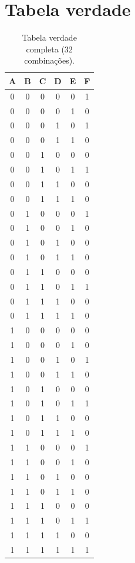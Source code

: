 \documentclass[report, 12pt]{uftreport}
\begin{document}
\section{Tabela verdade}
  \begin{table}[htb]
  \centering
  \caption{Tabela verdade completa (32 combinações).}
  \label{tab:tabela-verdade}
  \begin{tabular}{ccccc|c}
    \toprule
    A & B & C & D & E & F \\
    \midrule
    0 & 0 & 0 & 0 & 0 & 1 \\
    0 & 0 & 0 & 0 & 1 & 0 \\
    0 & 0 & 0 & 1 & 0 & 1 \\
    0 & 0 & 0 & 1 & 1 & 0 \\
    0 & 0 & 1 & 0 & 0 & 0 \\
    0 & 0 & 1 & 0 & 1 & 1 \\
    0 & 0 & 1 & 1 & 0 & 0 \\
    0 & 0 & 1 & 1 & 1 & 0 \\
    0 & 1 & 0 & 0 & 0 & 1 \\
    0 & 1 & 0 & 0 & 1 & 0 \\
    0 & 1 & 0 & 1 & 0 & 0 \\
    0 & 1 & 0 & 1 & 1 & 0 \\
    0 & 1 & 1 & 0 & 0 & 0 \\
    0 & 1 & 1 & 0 & 1 & 1 \\
    0 & 1 & 1 & 1 & 0 & 0 \\
    0 & 1 & 1 & 1 & 1 & 0 \\
    1 & 0 & 0 & 0 & 0 & 0 \\
    1 & 0 & 0 & 0 & 1 & 0 \\
    1 & 0 & 0 & 1 & 0 & 1 \\
    1 & 0 & 0 & 1 & 1 & 0 \\
    1 & 0 & 1 & 0 & 0 & 0 \\
    1 & 0 & 1 & 0 & 1 & 1 \\
    1 & 0 & 1 & 1 & 0 & 0 \\
    1 & 0 & 1 & 1 & 1 & 0 \\
    1 & 1 & 0 & 0 & 0 & 1 \\
    1 & 1 & 0 & 0 & 1 & 0 \\
    1 & 1 & 0 & 1 & 0 & 0 \\
    1 & 1 & 0 & 1 & 1 & 0 \\
    1 & 1 & 1 & 0 & 0 & 0 \\
    1 & 1 & 1 & 0 & 1 & 1 \\
    1 & 1 & 1 & 1 & 0 & 0 \\
    1 & 1 & 1 & 1 & 1 & 1 \\
    \bottomrule
  \end{tabular}
\end{table}
\end{document}
